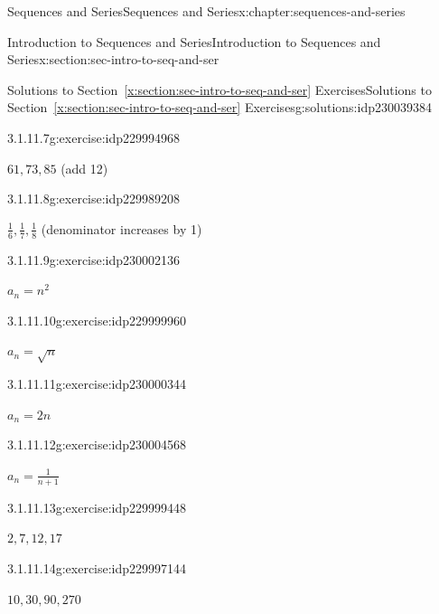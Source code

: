 \documentclass[twoside,10pt,]{book}
\newcommand{\xreffont}{\relax}
\numberwithin{equation}{section}
\begin{document}
\begin{chapterptx}{Sequences and Series}{}{Sequences and Series}{}{}{x:chapter:sequences-and-series}
\begin{sectionptx}{Introduction to Sequences and Series}{}{Introduction to Sequences and Series}{}{}{x:section:sec-intro-to-seq-and-ser}
\begin{solutions-subsection}{Solutions to Section~{\xreffont\ref*{x:section:sec-intro-to-seq-and-ser}} Exercises}{}{Solutions to Section~{\xreffont\ref*{x:section:sec-intro-to-seq-and-ser}} Exercises}{}{}{g:solutions:idp230039384}
\begin{exercisegroup}
\begin{divisionsolutioneg}{3.1.11.7}{}{g:exercise:idp229994968}
\par\smallskip%
\noindent\hypertarget{g:solution:idp229993560-main}{}\(61, 73, 85\) (add 12)\end{divisionsolutioneg}%
\begin{divisionsolutioneg}{3.1.11.8}{}{g:exercise:idp229989208}%
\par\smallskip%
\noindent\hypertarget{g:solution:idp229989080-main}{}\(\frac{1}{6},\frac{1}{7},\frac{1}{8}\) (denominator increases by 1)\end{divisionsolutioneg}%
\end{exercisegroup}
\par\medskip\noindent
\begin{exercisegroup}
\begin{divisionsolutioneg}{3.1.11.9}{}{g:exercise:idp230002136}%
\par\smallskip%
\noindent\hypertarget{g:solution:idp230004824-main}{}\(a_n = n^2\)\end{divisionsolutioneg}%
\begin{divisionsolutioneg}{3.1.11.10}{}{g:exercise:idp229999960}%
\par\smallskip%
\noindent\hypertarget{g:solution:idp229998808-main}{}\(a_n = \sqrt{n} \)\end{divisionsolutioneg}%
\begin{divisionsolutioneg}{3.1.11.11}{}{g:exercise:idp230000344}%
\par\smallskip%
\noindent\hypertarget{g:solution:idp229997784-main}{}\(a_n = 2n\)\end{divisionsolutioneg}%
\begin{divisionsolutioneg}{3.1.11.12}{}{g:exercise:idp230004568}%
\par\smallskip%
\noindent\hypertarget{g:solution:idp229997016-main}{}\(a_n = \frac{1}{n + 1}\)\end{divisionsolutioneg}%
\end{exercisegroup}
\par\medskip\noindent
\begin{exercisegroup}
\begin{divisionsolutioneg}{3.1.11.13}{}{g:exercise:idp229999448}%
\par\smallskip%
\noindent\hypertarget{g:solution:idp229999576-main}{}\(2, 7, 12, 17\)\end{divisionsolutioneg}%
\begin{divisionsolutioneg}{3.1.11.14}{}{g:exercise:idp229997144}%
\par\smallskip%
\noindent\hypertarget{g:solution:idp230001240-main}{}\(10, 30, 90, 270\)\end{divisionsolutioneg}%

\end{exercisegroup}
\end{solutions-subsection}
\end{sectionptx}
\end{chapterptx}
\end{document}
